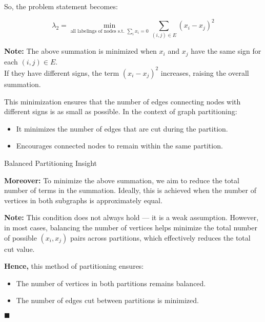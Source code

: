 \documentclass[aspectratio=169]{beamer}
\begin{document}
\begin{frame}
    So, the problem statement becomes:

    \[
    \lambda_2 = \min_{\text{all labelings of nodes s.t. } \sum_i x_i = 0} \sum_{(i,j) \in E} (x_i - x_j)^2
    \]

    \textbf{Note:} The above summation is minimized when \( x_i \) and \( x_j \) have the same sign for each \( (i, j) \in E \). \\
    If they have different signs, the term \( (x_i - x_j)^2 \) increases, raising the overall summation.

    \vspace{0.3cm}

    This minimization ensures that the number of edges connecting nodes with different signs is as small as possible. 
    In the context of graph partitioning:
    \begin{itemize}
        \item It minimizes the number of edges that are cut during the partition.
        \item Encourages connected nodes to remain within the same partition.
    \end{itemize}

     \vspace{0.3cm}
\end{frame}






\begin{frame}{Balanced Partitioning Insight}

\textbf{Moreover:} 
To minimize the above summation, we aim to reduce the total number of terms in the summation. Ideally, this is achieved when the number of vertices in both subgraphs is approximately equal.

\vspace{0.3cm}

\textbf{Note:} 
This condition does not always hold — it is a weak assumption. However, in most cases, balancing the number of vertices helps minimize the total number of possible \( (x_i, x_j) \) pairs across partitions, which effectively reduces the total cut value.

\vspace{0.3cm}

\textbf{Hence,} this method of partitioning ensures:
\begin{itemize}
    \item The number of vertices in both partitions remains balanced.
    \item The number of edges cut between partitions is minimized.
\end{itemize}

\hfill \(\blacksquare\)

\end{frame}
\end{document}
